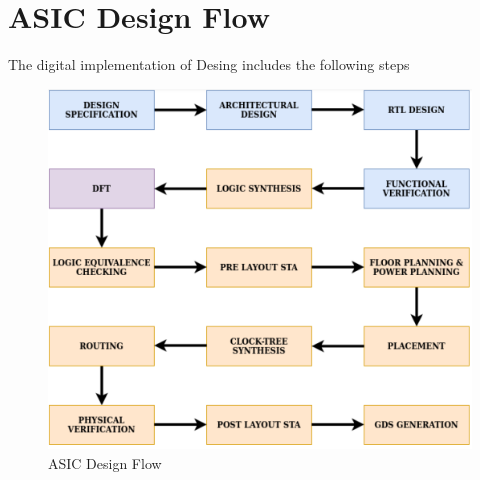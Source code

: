 \section{ASIC Design Flow}

The digital implementation of Desing includes the following steps

\begin{figure}[h]
    \centering
    \includegraphics[width = 0.9\linewidth]{./Theory/ASIC.png}
    \caption{ASIC Design Flow\cite{Sunny}}
\end{figure}
